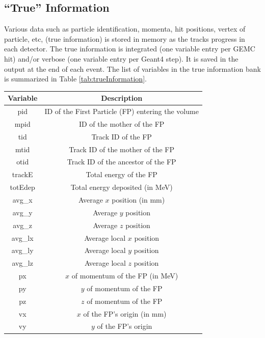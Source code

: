 \subsection{``True'' Information}

Various data such as particle identification, momenta, hit positions, vertex of particle, etc, (true information) is stored in memory
as the tracks progress in each detector. The true information is integrated (one variable entry per GEMC hit) and/or
verbose (one variable entry per Geant4 step). It is saved in the output at the end of each event.
The list of variables in the true information bank is summarized in Table \ref{tab:trueInformation}.

\begin{table}[h]
	\small
	\begin{center}
		\begin{tabular}{| c | c |}
			\hline \hline
			Variable    & Description  \\
			\hline
				pid         &   ID of the First Particle (FP) entering the volume \\
				mpid        &   ID of the mother of the FP \\
				tid         &   Track ID of the FP\\
				mtid        &   Track ID of the mother of the FP  \\
				otid        &   Track ID of the ancestor of the FP \\
				trackE      &   Total energy of the FP \\
				totEdep     &   Total energy deposited (in MeV) \\
				avg\_x      &   Average $x$ position  (in mm) \\
				avg\_y      &   Average $y$ position  \\
				avg\_z      &   Average $z$ position  \\
				avg\_lx     &   Average local $x$ position \\
				avg\_ly     &   Average local $y$ position \\
				avg\_lz     &   Average local $z$ position \\
				px          &   $x$  of momentum of the FP (in MeV) \\
				py          &   $y$  of momentum of the FP \\
				pz          &   $z$  of momentum of the FP \\
				vx          &   $x$  of the FP's origin (in mm) \\
				vy          &   $y$  of the FP's origin \\

\end{tabular}
\end{center}
\end{table}
